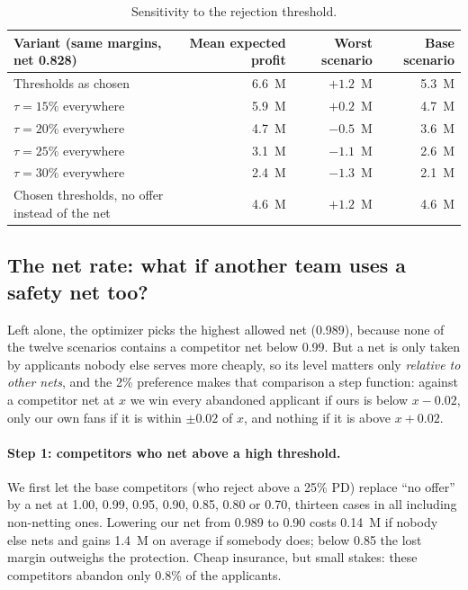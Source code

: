 \documentclass[11pt,a4paper]{article}
\newcommand{\meur}{M\texteuro}
\begin{document}
\begin{table}[h]\centering\small
\begin{tabular}{lrrr}
\toprule
Variant (same margins, net 0.828) & Mean expected profit & Worst scenario & Base scenario\\
\midrule
Thresholds as chosen       & 6.6~\meur{} & $+1.2$~\meur{} & 5.3~\meur{}\\
$\tau = 15\%$ everywhere   & 5.9~\meur{} & $+0.2$~\meur{} & 4.7~\meur{}\\
$\tau = 20\%$ everywhere   & 4.7~\meur{} & $-0.5$~\meur{} & 3.6~\meur{}\\
$\tau = 25\%$ everywhere   & 3.1~\meur{} & $-1.1$~\meur{} & 2.6~\meur{}\\
$\tau = 30\%$ everywhere   & 2.4~\meur{} & $-1.3$~\meur{} & 2.1~\meur{}\\
Chosen thresholds, no offer instead of the net & 4.6~\meur{} & $+1.2$~\meur{} & 4.6~\meur{}\\
\bottomrule
\end{tabular}
\caption{Sensitivity to the rejection threshold.}
\label{tab:tau}
\end{table}

\subsection{The net rate: what if another team uses a safety net too?}
\label{sec:net}
Left alone, the optimizer picks the highest allowed net (0.989), because none of the twelve scenarios contains a
competitor net below 0.99. But a net is only taken by applicants nobody else serves more cheaply, so its level
matters only \emph{relative to other nets}, and the 2\% preference makes that comparison a step function: against
a competitor net at $x$ we win every abandoned applicant if ours is below $x - 0.02$, only our own fans if it is
within $\pm 0.02$ of $x$, and nothing if it is above $x + 0.02$.

\paragraph{Step 1: competitors who net above a high threshold.} We first let the base competitors (who reject
above a 25\% PD) replace ``no offer'' by a net at 1.00, 0.99, 0.95, 0.90, 0.85, 0.80 or 0.70, thirteen cases in
all including non-netting ones. Lowering our net from 0.989 to 0.90 costs 0.14~\meur{} if nobody else nets and
gains 1.4~\meur{} on average if somebody does; below 0.85 the lost margin outweighs the protection. Cheap
insurance, but small stakes: these competitors abandon only 0.8\% of the applicants.
\end{document}
